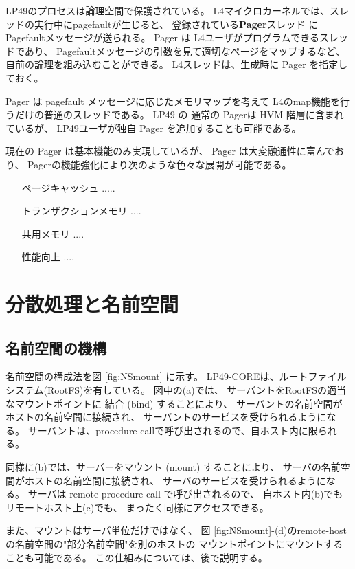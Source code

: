 \documentclass{jarticle}
\begin{document}
  LP49のプロセスは論理空間で保護されている。
  L4マイクロカーネルでは、スレッドの実行中にpagefaultが生じると、
  登録されている{\bf Pager}スレッド にPagefaultメッセージが送られる。
  Pager は L4ユーザがプログラムできるスレッドであり、
  Pagefaultメッセージの引数を見て適切なページをマップするなど、
  自前の論理を組み込むことができる。
  L4スレッドは、生成時に Pager を指定しておく。

  Pager は pagefault メッセージに応じたメモリマップを考えて
  L4のmap機能を行うだけの普通のスレッドである。
  LP49 の 通常の Pagerは HVM 階層に含まれているが、
  LP49ユーザが独自 Pager を追加することも可能である。

  現在の Pager は基本機能のみ実現しているが、
  Pager は大変融通性に富んでおり、
  Pagerの機能強化により次のような色々な展開が可能である。


\begin{itemize}
\item[ページキャッシュ]  .....

\item[トランザクションメモリ]  ....

\item[共用メモリ] ....

\item[性能向上]  ....
\end{itemize}



\section{分散処理と名前空間}
\subsection{名前空間の機構}

名前空間の構成法を図 \ref{fig:NSmount} に示す。
LP49-COREは、ルートファイルシステム(RootFS)を有している。
図中の(a)では、
サーバントをRootFSの適当なマウントポイントに
結合 (bind) することにより、
サーバントの名前空間がホストの名前空間に接続され、
サーバントのサービスを受けられるようになる。
サーバントは、procedure callで呼び出されるので、自ホスト内に限られる。

同様に(b)では、サーバーをマウント (mount) することにより、
サーバの名前空間がホストの名前空間に接続され、  
サーバのサービスを受けられるようになる。    
サーバは remote procedure call で呼び出されるので、
自ホスト内(b)でもリモートホスト上(c)でも、
まったく同様にアクセスできる。

また、マウントはサーバ単位だけではなく、
図 \ref{fig:NSmount}-(d)のremote-host の名前空間の"部分名前空間"を別のホストの
マウントポイントにマウントすることも可能である。
この仕組みについては、後で説明する。
\end{document}
